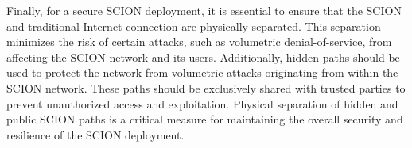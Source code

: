 Finally, for a secure SCION deployment, it is essential to ensure that the SCION and traditional Internet connection are physically separated.
This separation minimizes the risk of certain attacks, such as volumetric denial-of-service, from affecting the SCION network and its users.
Additionally, hidden paths should be used to protect the network from volumetric attacks originating from within the SCION network.
These paths should be exclusively shared with trusted parties to prevent unauthorized access and exploitation.
Physical separation of hidden and public SCION paths is a critical measure for maintaining the overall security and resilience of the SCION deployment.

